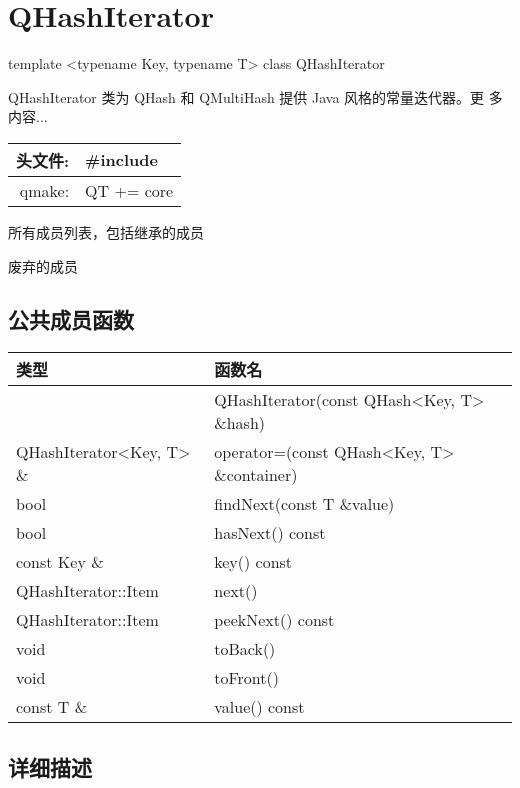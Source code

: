 \chapter{QHashIterator}

template <typename Key, typename T> class QHashIterator

QHashIterator 类为 QHash 和 QMultiHash 提供 Java 风格的常量迭代器。更
多内容...

\begin{tabular}{|r|l|}
	\hline
头文件: &	\#include\\
\hline
qmake: &	QT += core\\
	\hline
\end{tabular}

\begin{compactitem}
\item 所有成员列表，包括继承的成员
\item 废弃的成员
\end{compactitem}

\splitLine

\section{公共成员函数}

\begin{tabular}{|l|l|}
\hline
类型	&函数名\\
\hline
 	& QHashIterator(const QHash<Key, T> \&hash)\\
\hline
QHashIterator<Key, T> \& &	operator=(const QHash<Key, T> \&container)\\
\hline
bool &	findNext(const T \&value)\\
\hline
bool &	hasNext() const\\
\hline
const Key \& &	key() const\\
\hline
QHashIterator::Item &	next()\\
\hline
QHashIterator::Item &	peekNext() const\\
\hline
void &	toBack()\\
\hline
void &	toFront()\\
\hline
const T \& 	&value() const\\
\hline
\end{tabular}

\splitLine

\section{详细描述}

